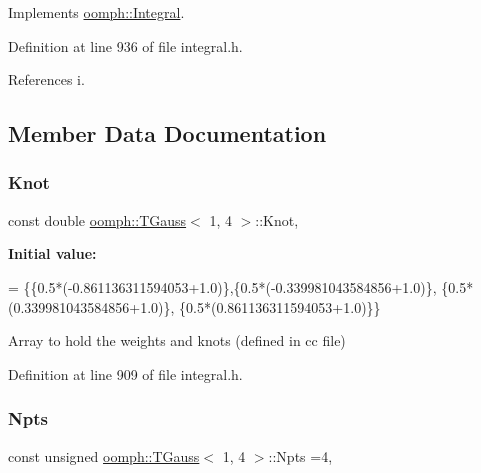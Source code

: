 Implements \hyperlink{classoomph_1_1Integral_ac65335e2aab120b285b3d6c294507b06}{oomph\+::\+Integral}.



Definition at line 936 of file integral.\+h.



References i.



\subsection{Member Data Documentation}
\mbox{\label{classoomph_1_1TGauss_3_011_00_014_01_4_a408d834ae1232bb1f25124a7109c209c}} 
\subsubsection{\texorpdfstring{Knot}{Knot}}
{\footnotesize\ttfamily const double \hyperlink{classoomph_1_1TGauss}{oomph\+::\+T\+Gauss}$<$ 1, 4 $>$\+::Knot\hspace{0.3cm}{\ttfamily [static]}, {\ttfamily [private]}}

{\bfseries Initial value\+:}
\begin{DoxyCode}
= 
\{\{0.5*(-0.861136311594053+1.0)\},\{0.5*(-0.339981043584856+1.0)\}, 
 \{0.5*(0.339981043584856+1.0)\}, \{0.5*(0.861136311594053+1.0)\}\}
\end{DoxyCode}


Array to hold the weights and knots (defined in cc file) 



Definition at line 909 of file integral.\+h.

\mbox{\label{classoomph_1_1TGauss_3_011_00_014_01_4_a219e645b38a17ae8c5de31501d6b3eb7}} 
\subsubsection{\texorpdfstring{Npts}{Npts}}
{\footnotesize\ttfamily const unsigned \hyperlink{classoomph_1_1TGauss}{oomph\+::\+T\+Gauss}$<$ 1, 4 $>$\+::Npts =4\hspace{0.3cm}{\ttfamily [static]}, {\ttfamily [private]}}




